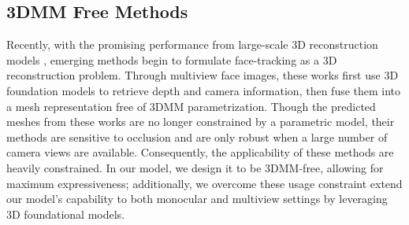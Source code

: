 \subsection{3DMM Free Methods}

Recently, with the promising performance from large-scale 3D reconstruction models \cite{wang2026vggtomega,depthanything3,pi3}, emerging methods begin to formulate face-tracking as a 3D reconstruction problem. Through multiview face images, these works first use 3D foundation models to retrieve depth and camera information, then fuse them into a mesh representation free of 3DMM parametrization\cite{uvfacefusion,vggtface}. Though the predicted meshes from these works are no longer constrained by a parametric model, their methods are sensitive to occlusion and are only robust when a large number of camera views are available. Consequently, the applicability of these methods are heavily constrained. In our model, we design it to be 3DMM-free, allowing for maximum expressiveness; additionally, we overcome these usage constraint extend our model's capability to both monocular and multiview settings by leveraging 3D foundational models.